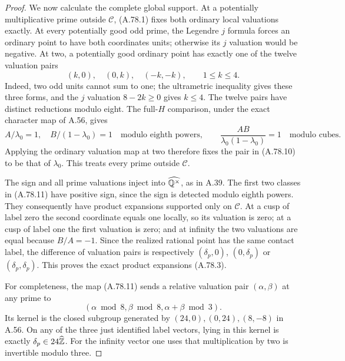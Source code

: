 \begin{proof}
We now calculate the complete global support.
At a potentially multiplicative prime outside $\mathcal C$,
(A.78.1) fixes both ordinary local valuations exactly.
At every potentially good odd prime, the Legendre $j$ formula
forces an ordinary point to have both coordinates units;
otherwise its $j$ valuation would be negative.
At two, a potentially good ordinary point has exactly one
of the twelve valuation pairs
\[
       (k,0),\quad(0,k),\quad(-k,-k),\qquad1\le k\le4.
\tag{A.78.10}
\]
Indeed, two odd units cannot sum to one; the ultrametric
inequality gives these three forms, and the $j$ valuation
$8-2k\ge0$ gives $k\le4$.
The twelve pairs have distinct reductions modulo eight.
The full-$H$ comparison, under the exact character map of A.56,
gives
\[
 A/\lambda_0=1,\quad B/(1-\lambda_0)=1
               \quad\text{modulo eighth powers},
 \qquad
 \frac{AB}{\lambda_0(1-\lambda_0)}=1
               \quad\text{modulo cubes}.
\tag{A.78.11}
\]
Applying the ordinary valuation map at two therefore fixes
the pair in (A.78.10) to be that of $\lambda_0$.
This treats every prime outside $\mathcal C$.

The sign and all prime valuations inject into
$\widehat{\mathbb Q^\times}$, as in A.39.
The first two classes in (A.78.11) have positive sign, since
the sign is detected modulo eighth powers.
They consequently have product expansions supported only
on $\mathcal C$.  At a cusp of label zero the second
coordinate equals one locally, so its valuation is zero;
at a cusp of label one the first valuation is zero; and
at infinity the two valuations are equal because $B/A=-1$.
Since the realized rational point has the same contact label,
the difference of valuation pairs is respectively
$(\delta_p,0)$, $(0,\delta_p)$ or $(\delta_p,\delta_p)$.
This proves the exact product expansions (A.78.3).

For completeness, the map (A.78.11) sends a relative
valuation pair $(\alpha,\beta)$ at any prime to
\[
              (\alpha\bmod8,\beta\bmod8,
                                      \alpha+\beta\bmod3).
\tag{A.78.12}
\]
Its kernel is the closed subgroup generated by
$(24,0),(0,24),(8,-8)$ in A.56.
On any of the three just identified label vectors, lying
in this kernel is exactly $\delta_p\in24\widehat{\mathbb Z}$.
For the infinity vector one uses that multiplication by
two is invertible modulo three.


\end{proof}
